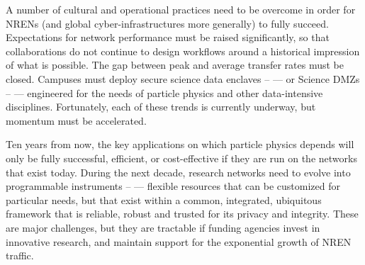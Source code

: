 A number of cultural and operational practices need to be overcome in order for NRENs (and global cyber-infrastructures more generally) to fully succeed. 
Expectations for network performance must be raised significantly, so that collaborations do not continue to design workflows around a historical impression of what is possible. 
The gap between peak and average transfer rates must be closed. 
Campuses must deploy secure science data enclaves – --- or  Science DMZs \cite{DMZ} – --- engineered for the needs of particle physics and other data-intensive disciplines.  Fortunately, each of these trends is currently underway, but momentum must be accelerated.   

Ten years from now, the key applications on which particle physics depends will only be fully successful, efficient, or cost-effective if they are run on the networks that exist today. 
During the next decade, research networks need to evolve into programmable instruments – --- flexible resources that can be customized for particular needs, but that exist within a common, integrated, ubiquitous framework that is reliable, robust and trusted for its privacy and integrity. These are major challenges, but they are tractable if funding agencies invest in innovative research, and maintain support for the exponential growth of NREN traffic. 


